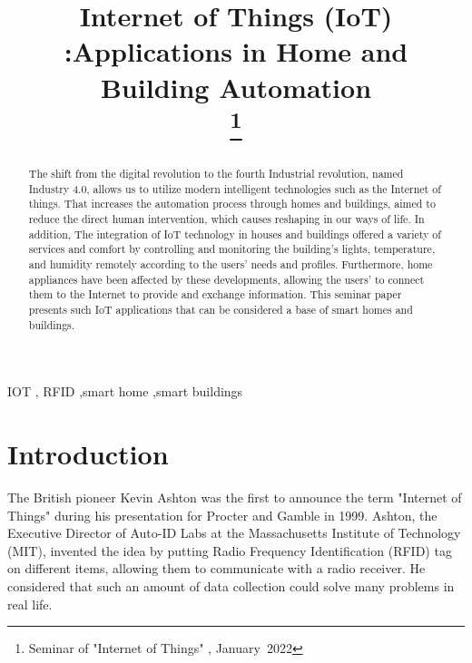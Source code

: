 \documentclass[conference]{IEEEtran}
\begin{document}
\title{Internet of Things (IoT) :Applications in  Home and Building Automation 
	\\

\thanks{Seminar of  "Internet of  Things" , January~2022}
}

\author{

}

\maketitle

\begin{abstract}
	
The shift from the digital revolution to the fourth Industrial revolution, named Industry 4.0, allows us to utilize modern intelligent technologies such as the Internet of things. That increases the automation process through homes and buildings, aimed to reduce the direct human intervention, which causes reshaping in our ways of life. In addition, The integration of  IoT technology in houses and buildings offered a variety of services and comfort by controlling and monitoring the building's lights, temperature, and humidity remotely according to the users' needs and profiles. Furthermore, home appliances have been affected by these developments, allowing the users' to connect them to the Internet to provide and exchange information. This seminar paper presents such IoT applications that can be considered a base of smart homes and buildings. 



\end{abstract}

\begin{IEEEkeywords}
IOT , RFID ,smart home ,smart buildings 
\end{IEEEkeywords}

\section{Introduction}


The British pioneer Kevin Ashton was the first to announce the term "Internet of Things" during his presentation for Procter and Gamble in 1999. Ashton, the Executive Director of Auto-ID Labs at the Massachusetts Institute of Technology (MIT), invented the idea by putting Radio Frequency Identification (RFID) tag on different items, allowing them to communicate with a radio receiver. He considered that such an amount of data collection could solve many problems in real life. 
\end{document}
